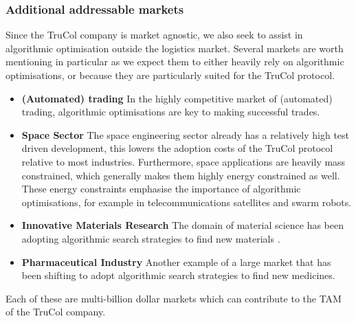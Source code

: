 \subsubsection{Additional addressable markets}\label{subsubsec:additional_markets}
Since the TruCol company is market agnostic, we also seek to assist in algorithmic optimisation outside the logistics market. Several markets are worth mentioning in particular as we expect them to either heavily rely on algorithmic optimisations, or because they are particularly suited for the TruCol protocol.
\begin{itemize}
	\item \textbf{(Automated) trading} In the highly competitive market of (automated) trading, algorithmic optimisations are key to making successful trades.
	\item \textbf{Space Sector} The space engineering sector already has a relatively high test driven development\cite{todo}, this lowers the adoption costs of the TruCol protocol relative to most industries. Furthermore, space applications are heavily mass constrained, which generally makes them highly energy constrained as well. These energy constraints emphasise the importance of algorithmic optimisations, for example in telecommunications satellites and swarm robots.
	\item \textbf{Innovative Materials Research} The domain of material science has been adopting algorithmic search strategies to find new materials  \cite{allahyari2020coevolutionary}.
	\item \textbf{Pharmaceutical Industry} Another example of a large market that has been shifting to adopt algorithmic search strategies to find new medicines.
\end{itemize}
Each of these are multi-billion dollar markets which can contribute to the TAM of the TruCol company.
